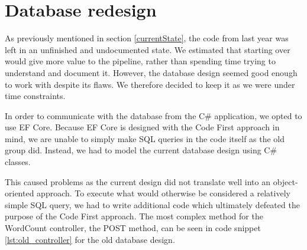 \section{Database redesign}

As previously mentioned in section \ref{currentState}, the code from last year was left in an unfinished and undocumented state. We estimated that starting over would give more value to the pipeline, rather than spending time trying to understand and document it.
However, the database design seemed good enough to work with despite its flaws. 
We therefore decided to keep it as we were under time constraints.

In order to communicate with the database from the C\# application, we opted to use EF Core.
Because EF Core is designed with the Code First approach in mind, we are unable to simply make SQL queries in the code itself as the old group did. 
Instead, we had to model the current database design using C\# classes. 

This caused problems as the current design did not translate well into an object-oriented approach.
To execute what would otherwise be considered a relatively simple SQL query, we had to write additional code which ultimately defeated the purpose of the Code First approach. 
The most complex method for the WordCount controller, the POST method, can be seen in code snippet \ref{lst:old_controller} for the old database design.

